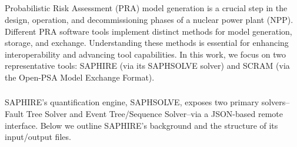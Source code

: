 
\subsection{\color{yellow}{Probabilistic Risk Assessment Model Structure}}
\label{sec:pra_model_structure}

Probabilistic Risk Assessment (PRA) model generation is a crucial step in the design, operation, and decommissioning phases of a nuclear power plant (NPP). Different PRA software tools implement distinct methods for model generation, storage, and exchange. Understanding these methods is essential for enhancing interoperability and advancing tool capabilities. In this work, we focus on two representative tools: SAPHIRE (via its SAPHSOLVE solver) and SCRAM (via the Open-PSA Model Exchange Format).

\subsubsection{\color{yellow}{SAPHSOLVE Models}}
\label{sec:saphsolve_models}

SAPHIRE's quantification engine, SAPHSOLVE, exposes two primary solvers--Fault Tree Solver and Event Tree/Sequence Solver--via a JSON-based remote interface. Below we outline SAPHIRE's background and the structure of its input/output files.

